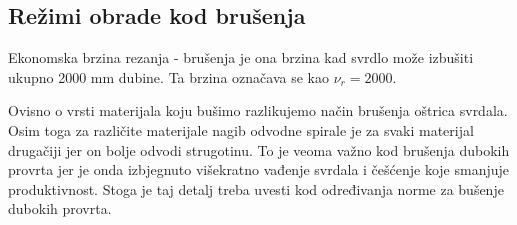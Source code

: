 \documentclass[a4paper,12pt]{article}
\numberwithin{figure}{section}
\begin{document}
\subsection{Režimi obrade kod brušenja}
Ekonomska brzina rezanja - brušenja je ona brzina kad svrdlo može izbušiti ukupno 2000 mm dubine. Ta brzina označava se kao $\nu_{r}=2000$.\par
Ovisno o vrsti materijala koju bušimo razlikujemo način brušenja oštrica svrdala. Osim toga za različite materijale nagib odvodne spirale je za svaki materijal drugačiji jer on bolje odvodi strugotinu. To je veoma važno kod brušenja dubokih provrta jer je onda izbjegnuto višekratno vađenje svrdala i češćenje koje smanjuje produktivnost. Stoga je taj detalj treba uvesti kod određivanja norme za bušenje dubokih provrta.
\begin{table}[!h]
\centering
{}
\end{table}
\end{document}
